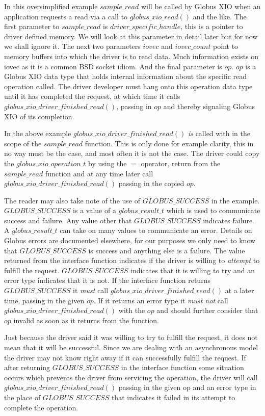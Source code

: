 \documentclass[11pt]{article}
\begin{document}
In this oversimplified example $sample\_read$ will be called
by Globus XIO when an application requests a read via a call to
$globus\_xio\_read()$ and the like.  The first parameter to
$sample\_read$ is $driver\_specific\_handle$, this is a pointer
to driver defined memory.  We will look at this parameter in detail
later but for now we shall ignore it.  The next two parameters 
$iovec$ and $iovec\_count$ point to memory buffers into which
the driver is to read data.  Much information exists on iovec as it 
is a common BSD socket idiom.  And the final parameter is $op$.
$op$ is a Globus XIO data type that holds internal information about
the specific read operation called.  The driver developer must 
hang onto this operation data type until it has completed the request,
at which time it calls $globus\_xio\_driver\_finished\_read()$, passing
in $op$ and thereby signaling Globus XIO of its completion.

In the above example $globus\_xio\_driver\_finished\_read()$ \emph{is} called
with in the scope of the $sample\_read$ function.  This is only done
for example clarity, this in no way must be the case, and most often
it is not the
case.  The driver could copy the $globus\_xio\_operation\_t$ by using
the $=$ operator, return from the $sample\_read$ function and at any time
later call $globus\_xio\_driver\_finished\_read()$ passing in the copied
$op$.

The reader may also take note of the use of $GLOBUS\_SUCCESS$ in the example.
$GLOBUS\_SUCCESS$ is a value of a $globus\_result\_t$ which is used to
communicate success and failure.  Any value other that $GLOBUS\_SUCCESS$
indicates failure.  A $globus\_result\_t$ can take on many values to
communicate an error.  Details on Globus errors are documented 
elsewhere, for our purposes we only need to know that $GLOBUS\_SUCCESS$ 
is success and anything else is a failure.
The value  returned from the interface function indicates
if the driver is willing to \emph{attempt} to fulfill the request.  
$GLOBUS\_SUCCESS$ indicates that it is willing to try and an error
type indicates that it is not.  
If the interface function returns $GLOBUS\_SUCCESS$
it \emph{must} call $globus\_xio\_driver\_finished\_read()$ at a later time, 
passing in the given $op$.  If it returns
an error type it \emph{must not} call $globus\_xio\_driver\_finished\_read()$
with the $op$ and should further consider that $op$ invalid as soon as it
returns from the function.

Just because the driver said it was willing to try to fulfill the
request, it does not mean that it will be successful.  Since we are
dealing with an asynchronous model the driver may not know right away
if it can successfully fulfill the request.  If after returning 
$GLOBUS\_SUCCESS$ in the interface function some situation occurs 
which prevents the driver from servicing
the operation, the driver will call $globus\_xio\_driver\_finished\_read()$
passing in the given op and an error type in the place of $GLOBUS\_SUCCESS$
that indicates it failed in its attempt to complete the operation.
\end{document}
